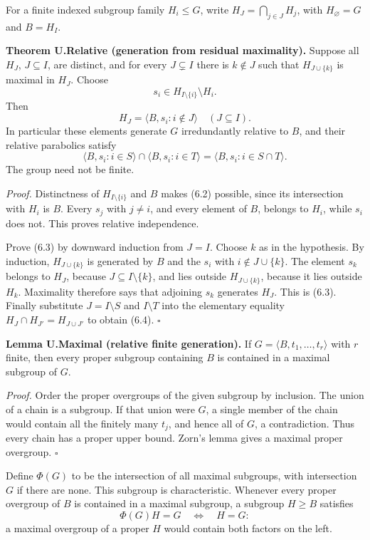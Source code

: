 \documentclass[
  11pt,
  a4paper,
]{article}
\begin{document}
For a finite indexed subgroup family \(H_i\leq G\), write
\(H_J=\bigcap_{j\in J}H_j\), with \(H_\varnothing=G\) and \(B=H_I\).

\textbf{Theorem U.Relative (generation from residual maximality).}
Suppose all \(H_J\), \(J\subseteq I\), are distinct, and for every
\(J\subsetneq I\) there is \(k\notin J\) such that \(H_{J\cup\{k\}}\) is
maximal in \(H_J\). Choose \[
s_i\in H_{I\setminus\{i\}}\setminus H_i.
\tag{6.2}
\] Then \[
H_J=\langle B,s_i:i\notin J\rangle\quad(J\subseteq I).
\tag{6.3}
\] In particular these elements generate \(G\) irredundantly relative to
\(B\), and their relative parabolics satisfy \[
\langle B,s_i:i\in S\rangle\cap\langle B,s_i:i\in T\rangle
=\langle B,s_i:i\in S\cap T\rangle.
\tag{6.4}
\] The group need not be finite.

\emph{Proof.} Distinctness of \(H_{I\setminus\{i\}}\) and \(B\) makes
(6.2) possible, since its intersection with \(H_i\) is \(B\). Every
\(s_j\) with \(j\ne i\), and every element of \(B\), belongs to \(H_i\),
while \(s_i\) does not. This proves relative independence.

Prove (6.3) by downward induction from \(J=I\). Choose \(k\) as in the
hypothesis. By induction, \(H_{J\cup\{k\}}\) is generated by \(B\) and
the \(s_i\) with \(i\notin J\cup\{k\}\). The element \(s_k\) belongs to
\(H_J\), because \(J\subseteq I\setminus\{k\}\), and lies outside
\(H_{J\cup\{k\}}\), because it lies outside \(H_k\). Maximality
therefore says that adjoining \(s_k\) generates \(H_J\). This is (6.3).
Finally substitute \(J=I\setminus S\) and \(I\setminus T\) into the
elementary equality \(H_J\cap H_{J'}=H_{J\cup J'}\) to obtain (6.4).
\(\square\)

\textbf{Lemma U.Maximal (relative finite generation).} If
\(G=\langle B,t_1,\ldots,t_r\rangle\) with \(r\) finite, then every
proper subgroup containing \(B\) is contained in a maximal subgroup of
\(G\).

\emph{Proof.} Order the proper overgroups of the given subgroup by
inclusion. The union of a chain is a subgroup. If that union were \(G\),
a single member of the chain would contain all the finitely many
\(t_j\), and hence all of \(G\), a contradiction. Thus every chain has a
proper upper bound. Zorn's lemma gives a maximal proper overgroup.
\(\square\)

Define \(\Phi(G)\) to be the intersection of all maximal subgroups, with
intersection \(G\) if there are none. This subgroup is characteristic.
Whenever every proper overgroup of \(B\) is contained in a maximal
subgroup, a subgroup \(H\geq B\) satisfies \[
\Phi(G)H=G\quad\Longleftrightarrow\quad H=G:
\tag{6.5}
\] a maximal overgroup of a proper \(H\) would contain both factors on
the left.
\end{document}
